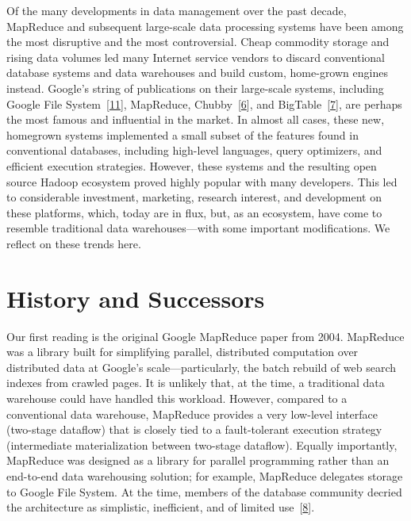 \documentclass[b5paper,11pt,twoside,openright]{book}
\newcommand\Section[2]{
  \hypertarget{#1}{
    \section{#2}
  }
}
\begin{document}
Of the many developments in data management over the past decade,
MapReduce and subsequent large-scale data processing systems have been
among the most disruptive and the most controversial. Cheap commodity
storage and rising data volumes led many Internet service vendors to
discard conventional database systems and data warehouses and build
custom, home-grown engines instead. Google's string of publications on
their large-scale systems, including Google File
System~{{[}\protect\hyperlink{ref-gfs}{11}{]}}, MapReduce,
Chubby~{{[}\protect\hyperlink{ref-chubby}{6}{]}}, and
BigTable~{{[}\protect\hyperlink{ref-bigtable}{7}{]}}, are perhaps the
most famous and influential in the market. In almost all cases, these
new, homegrown systems implemented a small subset of the features found
in conventional databases, including high-level languages, query
optimizers, and efficient execution strategies. However, these systems
and the resulting open source Hadoop ecosystem proved highly popular
with many developers. This led to considerable investment, marketing,
research interest, and development on these platforms, which, today are
in flux, but, as an ecosystem, have come to resemble traditional data
warehouses---with some important modifications. We reflect on these
trends here.

\Section{history-and-successors}{%
History and Successors
}

Our first reading is the original Google MapReduce paper from 2004.
MapReduce was a library built for simplifying parallel, distributed
computation over distributed data at Google's scale---particularly, the
batch rebuild of web search indexes from crawled pages. It is unlikely
that, at the time, a traditional data warehouse could have handled this
workload. However, compared to a conventional data warehouse, MapReduce
provides a very low-level interface (two-stage dataflow) that is closely
tied to a fault-tolerant execution strategy (intermediate
materialization between two-stage dataflow). Equally importantly,
MapReduce was designed as a library for parallel programming rather than
an end-to-end data warehousing solution; for example, MapReduce
delegates storage to Google File System. At the time, members of the
database community decried the architecture as simplistic, inefficient,
and of limited use~{{[}\protect\hyperlink{ref-mr-majorstep}{8}{]}}.
\end{document}
